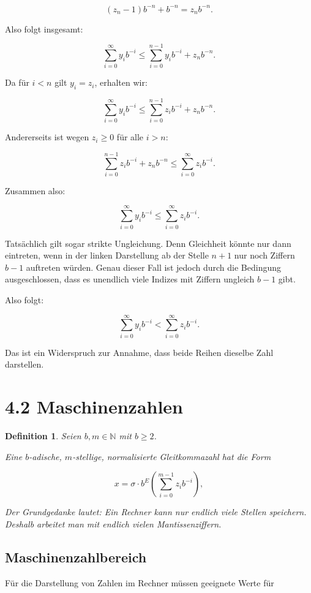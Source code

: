 \documentclass{article}
\newcommand{\N}{\mathbb{N}}
\newtheorem{defn}[thm]{Definition}
\begin{document}
\[
(z_n-1)b^{-n}+b^{-n}=z_n b^{-n}.
\]

Also folgt insgesamt:

\[
\sum_{i=0}^{\infty} y_i b^{-i}
\leq
\sum_{i=0}^{n-1} y_i b^{-i}+z_n b^{-n}.
\]

Da für \(i<n\) gilt \(y_i=z_i\), erhalten wir:

\[
\sum_{i=0}^{\infty} y_i b^{-i}
\leq
\sum_{i=0}^{n-1} z_i b^{-i}+z_n b^{-n}.
\]

Andererseits ist wegen \(z_i\geq 0\) für alle \(i>n\):

\[
\sum_{i=0}^{n-1} z_i b^{-i}+z_n b^{-n}
\leq
\sum_{i=0}^{\infty} z_i b^{-i}.
\]

Zusammen also:

\[
\sum_{i=0}^{\infty} y_i b^{-i}
\leq
\sum_{i=0}^{\infty} z_i b^{-i}.
\]

Tatsächlich gilt sogar strikte Ungleichung. Denn Gleichheit könnte nur dann eintreten, wenn in der linken Darstellung ab der Stelle \(n+1\) nur noch Ziffern \(b-1\) auftreten würden. Genau dieser Fall ist jedoch durch die Bedingung ausgeschlossen, dass es unendlich viele Indizes mit Ziffern ungleich \(b-1\) gibt.

Also folgt:

\[
\sum_{i=0}^{\infty} y_i b^{-i}
<
\sum_{i=0}^{\infty} z_i b^{-i}.
\]

Das ist ein Widerspruch zur Annahme, dass beide Reihen dieselbe Zahl darstellen.

\section{4.2 Maschinenzahlen}


\begin{defn}
Seien \(b,m\in\N\) mit \(b\geq 2\).

Eine \(b\)-adische, \(m\)-stellige, normalisierte Gleitkommazahl hat die Form

\[
x=\sigma\cdot b^E \left(\sum_{i=0}^{m-1} z_i b^{-i}\right),
\]

Der Grundgedanke lautet: Ein Rechner kann nur endlich viele Stellen speichern. Deshalb arbeitet man mit endlich vielen Mantissenziffern.
\end{defn}

\subsection*{Maschinenzahlbereich}

Für die Darstellung von Zahlen im Rechner müssen geeignete Werte für
\end{document}
